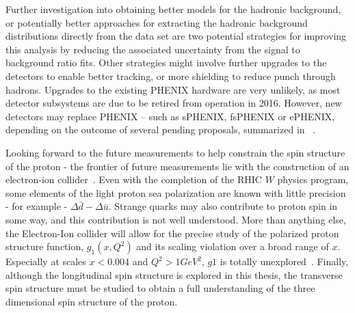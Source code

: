 Further investigation into obtaining better models for the hadronic background,
or potentially better approaches for extracting the hadronic background
distributions directly from the data set are two potential strategies for
improving this analysis by reducing the associated uncertainty from the signal
to background ratio fits. Other strategies might involve further upgrades to the
detectors to enable better tracking, or more shielding to reduce punch through
hadrons. Upgrades to the existing PHENIX hardware are very unlikely, as most
detector subsystems are due to be retired from operation in 2016. However, new
detectors may replace PHENIX -- such as sPHENIX, fsPHENIX or ePHENIX, depending
on the outcome of several pending proposals, summarized in
~\cite{Aschenauer2016}.

Looking forward to the future measurements to help constrain the spin structure
of the proton - the frontier of future measurements lie with the construction of
an electron-ion collider~\cite{Aschenauer2016}. Even with the completion of the
RHIC $W$ physics program, some elements of the light proton sea polarization are
known with little precision - for example - $\Delta\bar{d}-\Delta\bar{u}$.
Strange quarks may also contribute to proton spin in some way, and this
contribution is not well understood. More than anything else, the Electron-Ion
collider will allow for the precise study of the polarized proton structure
function, $g_1(x,Q^2)$ and its scaling violation over a broad range of $x$.
Especially at scales $x < 0.004$ and $Q^2 > 1 GeV^2$, $g1$ is totally
unexplored~\cite{Accardi2012}. Finally, although the longitudinal spin structure
is explored in this thesis, the transverse spin structure must be studied to
obtain a full understanding of the three dimensional spin structure of the
proton.
